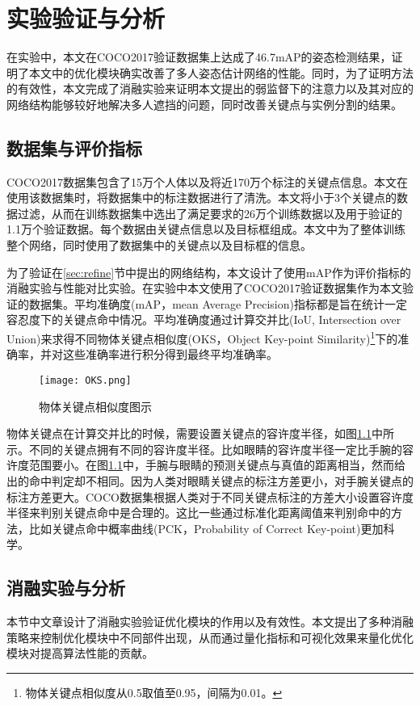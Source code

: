 \chapter{实验验证与分析}
\label{cha:exp}
在实验中，本文在COCO2017\cite{lin2014microsoft}验证数据集上达成了46.7mAP的姿态检测结果，证明了本文中的优化模块确实改善了多人姿态估计网络的性能。同时，为了证明方法的有效性，本文完成了消融实验来证明本文提出的弱监督下的注意力以及其对应的网络结构能够较好地解决多人遮挡的问题，同时改善关键点与实例分割的结果。
\section{数据集与评价指标}
\label{sec:dataset}
COCO2017数据集包含了15万个人体以及将近170万个标注的关键点信息。本文在使用该数据集时，将数据集中的标注数据进行了清洗。本文将小于3个关键点的数据过滤，从而在训练数据集中选出了满足要求的26万个训练数据以及用于验证的1.1万个验证数据。每个数据由关键点信息以及目标框组成。本文中为了整体训练整个网络，同时使用了数据集中的关键点以及目标框的信息。

为了验证在\ref{sec:refine}节中提出的网络结构，本文设计了使用mAP作为评价指标的消融实验与性能对比实验。在实验中本文使用了COCO2017验证数据集\cite{lin2014microsoft}作为本文验证的数据集。平均准确度(mAP，mean Average Precision)\cite{zhu2004recall}指标都是旨在统计一定容忍度下的关键点命中情况。平均准确度通过计算交并比(IoU, Intersection over Union)来求得不同物体关键点相似度(OKS，Object Key-point Similarity)\footnote{物体关键点相似度从0.5取值至0.95，间隔为0.01。}下的准确率，并对这些准确率进行积分得到最终平均准确率\cite{ruggero2017benchmarking}。

\begin{figure}
	\centering
	\texttt{[image: OKS.png]}
	\caption{物体关键点相似度图示\cite{ruggero2017benchmarking}}
	\label{fig:oksfigure}
\end{figure}

物体关键点在计算交并比的时候，需要设置关键点的容许度半径，如图\ref{fig:oksfigure}中所示。不同的关键点拥有不同的容许度半径。比如眼睛的容许度半径一定比手腕的容许度范围要小。在图\ref{fig:oksfigure}中，手腕与眼睛的预测关键点与真值的距离相当，然而给出的命中判定却不相同。因为人类对眼睛关键点的标注方差更小，对手腕关键点的标注方差更大。COCO数据集根据人类对于不同关键点标注的方差大小设置容许度半径来判别关键点命中是合理的。这比一些通过标准化距离阈值来判别命中的方法，比如关键点命中概率曲线\cite{andriluka20142d}(PCK，Probability of Correct Key-point)更加科学。

\section{消融实验与分析}
\label{sec:ablation}
本节中文章设计了消融实验验证优化模块的作用以及有效性。本文提出了多种消融策略来控制优化模块中不同部件出现，从而通过量化指标和可视化效果来量化优化模块对提高算法性能的贡献。
